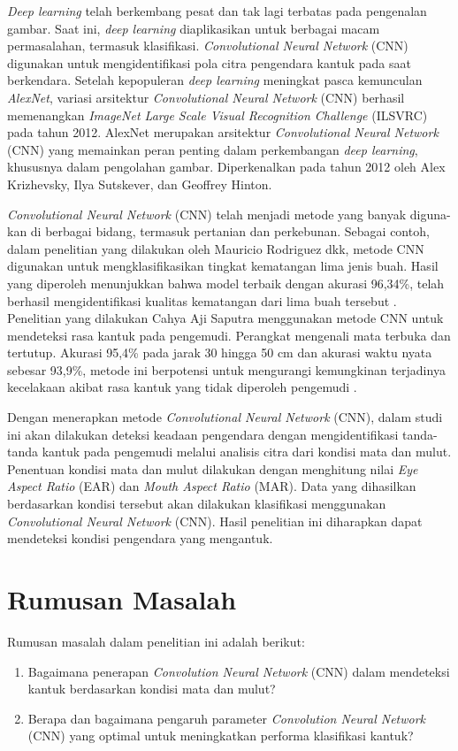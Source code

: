     \textit{Deep learning} telah berkembang pesat dan tak lagi terbatas pada pengenalan gambar. Saat ini, \textit{deep learning} diaplikasikan untuk berbagai macam permasalahan, termasuk klasifikasi. \textit{Convolutional Neural Network} (CNN) digunakan untuk mengidentifikasi pola citra pengendara kantuk pada saat berkendara. 
    Setelah kepopuleran \textit{deep learning} meningkat pasca kemunculan \textit{AlexNet}, variasi arsitektur \textit{Convolutional Neural Network} (CNN) berhasil memenangkan \textit{ImageNet Large Scale Visual Recognition Challenge} (ILSVRC) pada tahun 2012. AlexNet merupakan arsitektur \textit{Convolutional Neural Network} (CNN) yang memainkan peran penting dalam perkembangan \textit{deep learning}, khususnya dalam pengolahan gambar. Diperkenalkan pada tahun 2012 oleh Alex Krizhevsky, Ilya Sutskever, dan Geoffrey Hinton. 
    
    
    \textit{Convolutional Neural Network} (CNN) telah menjadi metode yang banyak diguna-kan di berbagai bidang, 
    termasuk pertanian dan perkebunan. Sebagai contoh, dalam penelitian yang dilakukan oleh Mauricio Rodriguez dkk, 
    metode CNN digunakan untuk mengklasifikasikan tingkat kematangan lima jenis buah. Hasil yang diperoleh menunjukkan
     bahwa model terbaik dengan akurasi 96,34\%, telah berhasil mengidentifikasi kualitas kematangan dari lima buah 
     tersebut \cite{Rodriguez2021}. Penelitian yang dilakukan Cahya Aji Saputra menggunakan metode CNN untuk mendeteksi 
     rasa kantuk pada pengemudi. Perangkat mengenali mata terbuka dan tertutup. Akurasi 95,4\% pada jarak 30 hingga 50 cm dan akurasi waktu nyata sebesar 93,9\%, metode ini berpotensi untuk mengurangi kemungkinan terjadinya kecelakaan akibat rasa kantuk yang tidak diperoleh pengemudi \cite{Saputra2021}.

    Dengan menerapkan metode \textit{Convolutional Neural Network} (CNN), dalam studi ini akan dilakukan deteksi keadaan pengendara dengan mengidentifikasi tanda-tanda kantuk pada pengemudi melalui analisis citra dari kondisi mata dan mulut. Penentuan kondisi mata dan mulut dilakukan dengan menghitung nilai 
    \textit{Eye Aspect Ratio} (EAR) dan \textit{Mouth Aspect Ratio} (MAR). Data yang dihasilkan berdasarkan kondisi tersebut akan dilakukan klasifikasi menggunakan \textit{Convolutional Neural Network} (CNN). Hasil penelitian ini diharapkan dapat mendeteksi kondisi pengendara yang mengantuk.

   
\section{Rumusan Masalah}
Rumusan masalah dalam penelitian ini adalah berikut:
\begin{enumerate}

    \item Bagaimana penerapan \textit{Convolution Neural Network} (CNN) dalam mendeteksi kantuk berdasarkan kondisi mata dan mulut?

    \item Berapa dan bagaimana pengaruh parameter \textit{Convolution Neural Network} (CNN) yang optimal untuk meningkatkan performa klasifikasi kantuk?
\end{enumerate}


